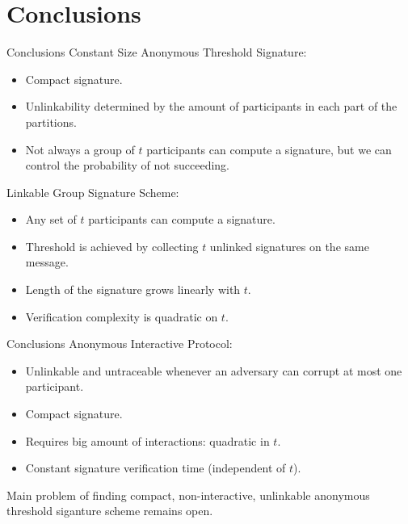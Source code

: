 \section{Conclusions}
\begin{frame}{Conclusions}
Constant Size Anonymous Threshold Signature:
\begin{itemize}
\item Compact signature.
\item Unlinkability determined by the amount of participants in each part of the partitions.
\item Not always a group of $t$ participants can compute a signature, but we can control the probability of not succeeding.
\end{itemize}

Linkable Group Signature Scheme:
\begin{itemize}
\item Any set of $t$ participants can compute a signature.
\item Threshold is achieved by collecting $t$ unlinked signatures on the same message.
\item Length of the signature grows linearly with $t$.
\item Verification complexity is quadratic on $t$.
\end{itemize}


\end{frame}

\begin{frame}{Conclusions}
Anonymous Interactive Protocol:
\begin{itemize}
\item Unlinkable and untraceable whenever an adversary can corrupt at most one participant.
\item Compact signature.
\item Requires big amount of interactions: quadratic in $t$.
\item Constant signature verification time (independent of $t$).
\end{itemize}

Main problem of finding compact, non-interactive, unlinkable anonymous threshold siganture scheme remains open.
\end{frame}